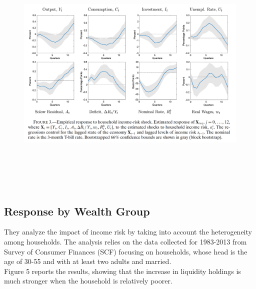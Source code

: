 \documentclass[titlepage]{\econtex}
\begin{document}
\begin{figure}[H]
  \centering
  \includegraphics[width=1\textwidth, height=12cm]{Figure3.png}
  \end{figure}

\hypertarget{Response by Wealth Group}{}
\subsection{Response by Wealth Group}

They analyze the impact of income risk by taking into account the heterogeneity among households. The analysis relies on the data collected for 1983-2013 from Survey of Consumer Finances (SCF) focusing on households, whose head is the age of 30-55 and with at least two adults and married.\\
Figure 5 reports the results, showing that the increase in liquidity holdings is much stronger when the household is relatively poorer.
\end{document}
